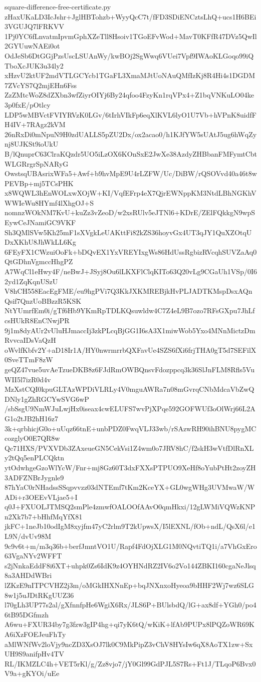 \documentclass[11pt]{article}
\theoremstyle{definition}
\theoremstyle{remark}
\begin{document}
\begin{filecontents*}[overwrite]{square-difference-free-certificate.py}
zHaxUKaLD3IcJshr+JglHBTohzb+WyyQcC7t/fFD3SDiENCztsLhQ+ucs1H6BEi3VGUJQ7lFRKVV
1Pj0YC6fLnvatmIpvmGphXZeTll8Hsoiv1TGoEFvWod+MavT0KFfR47DVz5QwIl2GYUuwNAEi0ot
OdJeSb6DtGGjPzsUscLSUAnWy/kwBOj2SgWwq6VUei7Vpf9IWAoKLGoqo99iQTboXcJUK3u34ly2
xHzvU2ktUF2mdVTLGCYcb1TGaFL3XmaMJtUoNAuQMfIzKj8R4Hi4s1DGDM7ZVcYS7Q2mjEHn6Fss
ZzZMtcWoZ8dZXbn3wfZiyrOIYj6By24qfoo4FzyKn1rqVPx4+Z1bqVNKuLO04ke3p0fxE/pOtlcy
LDP5wMBVctFVIYRVzK0LGv/6tIrhVIkFp6eqXlKVL6lyO1U7Vb+hVPnK8uidfFH4IV+7RAgz2kVM
26nRxDi0mNpuN9H0zdUALLS5pZU2Dx/ox2acao0/h1KJfYW5sUAtJ5ug6hWqZynj8UJKSt9ioUkU
B/lQnuprC63ClraKQzdr5UO5iLzOX6KOnSxE2JwXe38AzdyZHBbanFMFymtCbtWLGRrgrSpNARyG
OwstsqUBAsrixWFa5+Awf+b9hvMpE9U4rLZFW/Uc/DiBW/rQSOVvd40a46t8wPEVBp+mj5TCsPHK
x8WQWL3hEnWOLxwXOjW+KI/VqfEFrp4eX7QjrEWNppKM3NtdLBhNGKhVWWIeWu8HYmf4lXhgOJ+S
nomnzWOkNM7KvU+kuZz3vZeoD/w2xsRUlv5eJTNl6+KDrE/ZElFQkkgN9wpSEywCeJNamiGC9VKF
Sh3QMlSVw5Kh25mF1sXVgkLeUAKttFi82kZS36hoyvGx4UT3qJY1QuXZOtqUDxXKhU8JhWkLL6Kg
6FEyFX1CWzuiOoFk+bDQvEX1YxVREYIxgWs86HdUssRgbizRVcqhSUVZaAq0QtGDhnVgmccHhgPZ
A7WqCl1eHwy4F/neBwJ+JSyj8Ou6lLKXFlClqKITo63Q20vLg9CGaUh1VSp/0I62yd1ZqKqnUSzU
V8hCH558EacEgFME/eu9hgPVi7Q3KkJXKMREBjkHvPLJADTKMspDsxAQnQsif7QnzUoBBzzR5KSK
NtYUmrfEm0i/gTf6Hb9YKmRpTDLKQsuwldw4C7Z4eL9B7ozo7RFsGXpu7JhLfcsHUkR8EnCNwjPR
9j1m8dyAUr2vUluHJmaccIj3zkPLcqBjGG1I6sA3X1miwWob5Yxo4MNnMictzDmRvvcaIDsVaQzH
oWvlfKbfv2Y+aD18Ir1A/HY0nwrmrrbQXFavUe4SZS6fXi6frjTHA0gT5d7SEFilX0SveTTmF8zW
geQZ47vue5uvAeTzueDKB8z6FJdRmOWBQnsvFdozppcq3k36SlJnFLM8Rfls5VuWII5l7izR0d4v
MzXstCQI0kpuGLTAzWPDiVLRLy4V0mguAWRa7n08mGvrqCNbMdcaVbZwQDNly1gZhRGCYwSVG6wP
/sbSsgU9NmWJuLwjHx0iseax4cwELUFS7wvPjXPqe592GOFWUf3oOlWrj66L2AG1o2tJB2hH16z7
3k+qrbhicjG0o+uUqz66tnE+unbPDZ0FwqVLJ33wb/rSAzwRH90ihBNU8pygMCcozglyO0E7QR8w
Qc71HXS/PVXVDb3ZAxeueGN5CekVsi1Z4wm0o7JRV8hC/f2skH3wVtfDlRnXLy2tQq5enPLCQktn
ytOdwhgeGzoWlYcW/Fnr+mj8Gz60T3dxFXXsPTPUO9XeHf8oYubPtHt2zoyZH3ADFZNBrJygnle9
87hYaC0rNHadssSSqpvvzz03dNTEmf7tKm2KceYX+GL0wgWHg3UVMwaW/WADi+r3OEEvVLjae5+I
q0J+FXUOLJTMSQ2smPle4zmwfOALOOfAAvO0qmHkxi/12gLWMiVQWzKNPn2Xk7b7+bHhfMqYfX81
jkFC+1neJb10odIgM8xyjfm47yC2rlm9T2kUpwsX/I5lEXNL/fOb+ndL/QsX6l/e1L9N/dvUv98M
9c9v6t+m/m3q36b+berfJmntVO1U/Rapf4FdOjXLG1M0NQvtiTQ1i/a7VhGxEro63VgaNYv2WFFT
s2jNnkaEddF8i6XT+uhpk0Zs6IdK9z4OYHNdRZ2IV6o2Vo144ZBKI160cgaNeJlsq8a3AHDdWBri
lZKzE9nITPCVHZ2j3m/oMGkIHXNnEp+bqJNXnxoHyeoa9bHHF2Wj7wz6SLG8w1j5uJDtRKgUUZ36
l70gLh3UP77s2al/gXfnnfpHe6WgiX6Rx/JLS6P+BUlsbdQ/lG+ax8df+YGh0/po46tB95DGfmzh
A6wu+FXUR34by7g3fzw3gIP4hg+qi7yK6tQ/wKiK+lfAb9PUPx8lPQZoWR69KA6iXzFOEJeuFhTy
aMlWNfWv2loVjy9ncZD3XsOJ7lk0C9MkPipZ3vChV8HYsIw6qX8AoTX1zw+SxUH9S9anifpHv4TV
RL/IKMZLC4h+VET5rKl/g/Zz8vjo7/jY0Gl99GdPJL5S7Rs+Ft1J/TLqoP6Bvx0V9a+gKYOi/uEe

\end{filecontents*}
\end{document}
